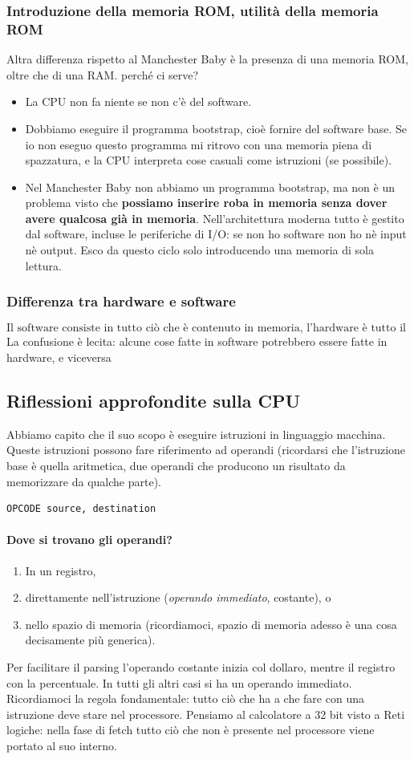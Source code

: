 \documentclass[11pt]{report}
\theoremstyle{definition}
\begin{document}
\subsubsection{Introduzione della memoria ROM, utilità della memoria ROM} Altra differenza rispetto al Manchester Baby è la presenza di una memoria ROM, oltre che di una RAM. perché ci serve?
\begin{itemize}
\item La CPU non fa niente se non c'è del software.
\item Dobbiamo eseguire il programma bootstrap, cioè fornire del software base. Se io non eseguo questo programma mi ritrovo con una memoria piena di spazzatura, e la CPU interpreta cose casuali come istruzioni (se possibile).
\item Nel Manchester Baby non abbiamo un programma bootstrap, ma non è un problema visto che \textbf{possiamo inserire roba in memoria senza dover avere qualcosa già in memoria}. Nell'architettura moderna tutto è gestito dal software, incluse le periferiche di I/O: se non ho software non ho nè input nè output. Esco da questo ciclo solo introducendo una memoria di sola lettura.
\end{itemize}
\subsubsection{Differenza tra hardware e software} 
\[\boxed{\text{Il software consiste in tutto ciò che è contenuto in memoria, l'hardware è tutto il resto.}}\]
La confusione è lecita: alcune cose fatte in software potrebbero essere fatte in hardware, e viceversa
\clearpage
\subsection{Riflessioni approfondite sulla CPU} 
Abbiamo capito che il suo scopo è eseguire istruzioni in linguaggio macchina. Queste istruzioni possono fare riferimento ad operandi (ricordarsi che l'istruzione base è quella aritmetica, due operandi che producono un risultato da memorizzare da qualche parte).
\begin{verbatim}
OPCODE source, destination
\end{verbatim}
\paragraph{Dove si trovano gli operandi?}
\begin{enumerate}
\item In un registro,
\item direttamente nell'istruzione (\emph{operando immediato}, costante), o
\item nello spazio di memoria (ricordiamoci, spazio di memoria adesso è una cosa decisamente più generica).
\end{enumerate}
Per facilitare il parsing l'operando costante inizia col dollaro, mentre il registro con la percentuale. In tutti gli altri casi si ha un operando immediato. Ricordiamoci la regola fondamentale: tutto ciò che ha a che fare con una istruzione deve stare nel processore. Pensiamo al calcolatore a 32 bit visto a Reti logiche: nella fase di fetch tutto ciò che non è presente nel processore viene portato al suo interno.
\end{document}
